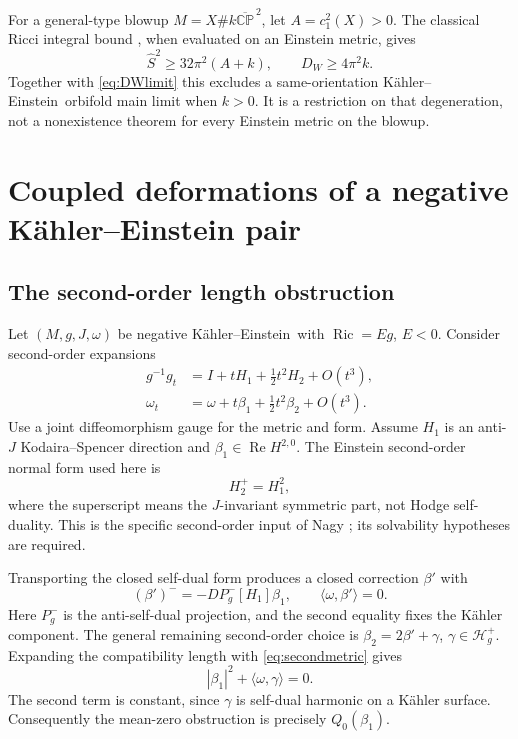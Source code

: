 \documentclass[11pt,a4paper]{article}
\theoremstyle{definition}
\theoremstyle{remark}
\newcommand{\Ric}{\operatorname{Ric}}
\newcommand{\Rea}{\operatorname{Re}}
\newcommand{\CP}{\mathbb{CP}}
\newcommand{\KE}{K\"ahler--Einstein}
\begin{document}
For a general-type blowup $M=X\#k\overline{\CP}^{\,2}$, let $A=c_1^2(X)>0$. The classical Ricci integral bound \cite{LeBrunRicci}, when evaluated on an Einstein metric, gives
\[
 \widehat S^2\ge32\pi^2(A+k),\qquad D_W\ge4\pi^2k.
\]
Together with \eqref{eq:DWlimit} this excludes a same-orientation \KE\ orbifold main limit when $k>0$. It is a restriction on that degeneration, not a nonexistence theorem for every Einstein metric on the blowup.

\section{Coupled deformations of a negative K\"ahler--Einstein pair}
\subsection{The second-order length obstruction}
Let $(M,g,J,\omega)$ be negative \KE\ with $\Ric=Eg$, $E<0$. Consider second-order expansions
\begin{align*}
 g^{-1}g_t&=I+tH_1+\tfrac12t^2H_2+O(t^3),\\
 \omega_t&=\omega+t\beta_1+\tfrac12t^2\beta_2+O(t^3).
\end{align*}
Use a joint diffeomorphism gauge for the metric and form. Assume $H_1$ is an anti-$J$ Kodaira--Spencer direction and $\beta_1\in\Rea H^{2,0}$. The Einstein second-order normal form used here is
\begin{equation}\label{eq:secondmetric}
 H_2^+=H_1^2,
\end{equation}
where the superscript means the $J$-invariant symmetric part, not Hodge self-duality. This is the specific second-order input of Nagy \cite[Theorem 1.6]{Nagy}; its solvability hypotheses are required.

Transporting the closed self-dual form produces a closed correction $\beta'$ with
\[
 (\beta')^-=-D P_g^-[H_1]\beta_1,\qquad \langle\omega,\beta'\rangle=0.
\]
Here $P_g^-$ is the anti-self-dual projection, and the second equality fixes the K\"ahler component. The general remaining second-order choice is $\beta_2=2\beta'+\gamma$, $\gamma\in\mathcal H_g^+$. Expanding the compatibility length with \eqref{eq:secondmetric} gives
\begin{equation}\label{eq:secondlength}
 |\beta_1|^2+\langle\omega,\gamma\rangle=0.
\end{equation}
The second term is constant, since $\gamma$ is self-dual harmonic on a K\"ahler surface. Consequently the mean-zero obstruction is precisely $Q_0(\beta_1)$.
\end{document}
